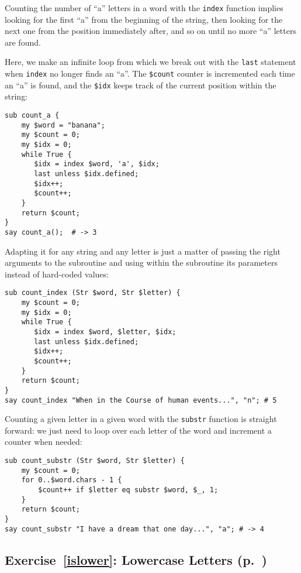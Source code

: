 Counting the number of ``a'' letters in a word with the {\tt index} 
function implies looking for the first ``a'' from the 
beginning of the string, then looking for the next one 
from the position immediately after, and so on until no 
more ``a'' letters are found.

Here, we make an infinite loop from which we break out with 
the {\tt last} statement when {\tt index} no longer finds 
an ``a''. The {\tt \$count} counter is incremented each time 
an ``a'' is found, and the {\tt \$idx} keeps track of the 
current position within the string:

\begin{verbatim}
sub count_a {
    my $word = "banana";
    my $count = 0;
    my $idx = 0;
    while True {
       $idx = index $word, 'a', $idx;
       last unless $idx.defined;
       $idx++;
       $count++;
    }
    return $count;
}
say count_a();  # -> 3
\end{verbatim}

Adapting it for any string and any letter is just a matter 
of passing the right arguments to the subroutine and using 
within the subroutine its parameters instead of hard-coded 
values:

\begin{verbatim}
sub count_index (Str $word, Str $letter) {
    my $count = 0;
    my $idx = 0;
    while True {
       $idx = index $word, $letter, $idx;
       last unless $idx.defined;
       $idx++;
       $count++;
    }
    return $count;
}
say count_index "When in the Course of human events...", "n"; # 5
\end{verbatim}

Counting a given letter in a given word with the {\tt substr} 
function is straight forward: we just need to loop over 
each letter of the word and increment a counter when needed:

\begin{verbatim}
sub count_substr (Str $word, Str $letter) {
    my $count = 0;
    for 0..$word.chars - 1 {
        $count++ if $letter eq substr $word, $_, 1;
    }
    return $count;
}
say count_substr "I have a dream that one day...", "a"; # -> 4
\end{verbatim}

\subsection{Exercise~\ref{islower}: Lowercase Letters (p.~\pageref{islower})}
\label{sol_islower}

